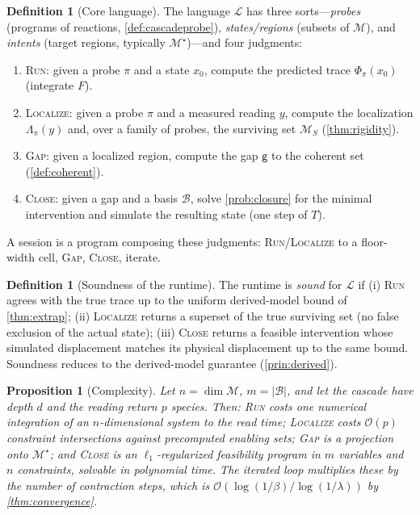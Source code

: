 \documentclass[11pt,a4paper]{article}
\theoremstyle{thmstyle}
\newtheorem{proposition}[theorem]{Proposition}
\theoremstyle{definition}
\newtheorem{definition}[theorem]{Definition}
\theoremstyle{remark}
\newcommand{\Man}{\mathcal{M}}          %
\newcommand{\st}{x}                     %
\newcommand{\fld}{F}                    %
\newcommand{\probe}{\pi}                %
\newcommand{\loc}{\Lambda}              %
\newcommand{\gap}{\mathsf{g}}           %
\newcommand{\flo}{\beta}                %
\newcommand{\basis}{\mathcal{B}}        %
\newcommand{\dsl}{\mathcal{L}}          %
\newcommand{\abs}[1]{\lvert#1\rvert}
\begin{document}
\begin{definition}[Core language]
\label{def:dsl}
The language $\dsl$ has three sorts---\emph{probes} (programs of reactions,
\cref{def:cascadeprobe}), \emph{states/regions} (subsets of $\Man$), and
\emph{intents} (target regions, typically $\Man^\star$)---and four
judgments:
\begin{enumerate}[label=\textup{(J\arabic*)},leftmargin=2.6em,itemsep=2pt]
\item \textsc{Run}: given a probe $\probe$ and a state $\st_0$, compute the
predicted trace $\Phi_\probe(\st_0)$ (integrate $\fld$).
\item \textsc{Localize}: given a probe $\probe$ and a measured reading $y$,
compute the localization $\loc_\probe(y)$ and, over a family of probes, the
surviving set $\Man_S$ (\cref{thm:rigidity}).
\item \textsc{Gap}: given a localized region, compute the gap $\gap$ to the
coherent set (\cref{def:coherent}).
\item \textsc{Close}: given a gap and a basis $\basis$, solve
\cref{prob:closure} for the minimal intervention and simulate the resulting
state (one step of $T$).
\end{enumerate}
A session is a program composing these judgments: \textsc{Run}/\textsc{Localize}
to a floor-width cell, \textsc{Gap}, \textsc{Close}, iterate.
\end{definition}

\begin{definition}[Soundness of the runtime]
\label{def:soundness}
The runtime is \emph{sound} for $\dsl$ if (i) \textsc{Run} agrees with the
true trace up to the uniform derived-model bound of \cref{thm:extrap};
(ii) \textsc{Localize} returns a superset of the true surviving set (no
false exclusion of the actual state); (iii) \textsc{Close} returns a
feasible intervention whose simulated displacement matches its physical
displacement up to the same bound. Soundness reduces to the derived-model
guarantee (\cref{prin:derived}).
\end{definition}

\begin{proposition}[Complexity]
\label{prop:complexity}
Let $n=\dim\Man$, $m=\abs\basis$, and let the cascade have depth $d$ and
the reading return $p$ species. Then: \textsc{Run} costs one numerical
integration of an $n$-dimensional system to the read time; \textsc{Localize}
costs $\mathcal{O}(p)$ constraint intersections against precomputed
enabling sets; \textsc{Gap} is a projection onto $\Man^\star$; and
\textsc{Close} is an $\ell_1$-regularized feasibility program in $m$
variables and $n$ constraints, solvable in polynomial time. The iterated
loop multiplies these by the number of contraction steps, which is
$\mathcal{O}(\log(1/\flo)/\log(1/\lambda))$ by \cref{thm:convergence}.
\end{proposition}
\end{document}
